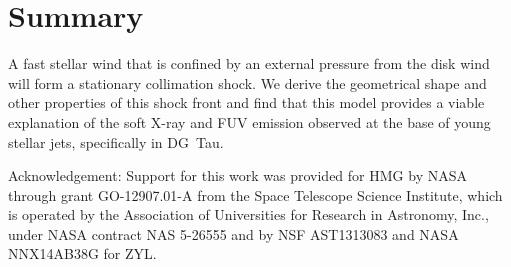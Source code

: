 \documentclass[manuscript]{aastex}
\begin{document}
\section{Summary}
\label{sect:summary}
A fast stellar wind that is confined by an external pressure from the disk wind will form a stationary collimation shock. We derive the geometrical shape and other properties of this shock front and find that this model provides a viable explanation of the soft X-ray and FUV emission observed at the base of young stellar jets, specifically in DG~Tau.

Acknowledgement: Support for this work was provided for HMG by NASA through grant GO-12907.01-A from the Space Telescope Science Institute, which is operated by the Association of Universities for Research in Astronomy, Inc., under NASA contract NAS 5-26555 and by NSF AST1313083 and NASA NNX14AB38G for ZYL.
\end{document}
